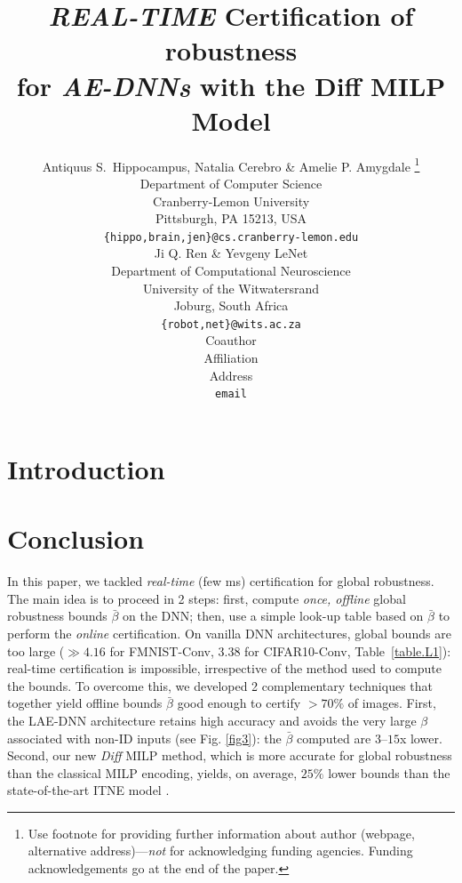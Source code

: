 \documentclass{article} %
\title{\emph{REAL-TIME} Certification of robustness 
\\ for \emph{AE-DNNs} with the Diff MILP Model}
\author{Antiquus S.~Hippocampus, Natalia Cerebro \& Amelie P. Amygdale \thanks{ Use footnote for providing further information
about author (webpage, alternative address)---\emph{not} for acknowledging
funding agencies.  Funding acknowledgements go at the end of the paper.} \\
Department of Computer Science\\
Cranberry-Lemon University\\
Pittsburgh, PA 15213, USA \\
\texttt{\{hippo,brain,jen\}@cs.cranberry-lemon.edu} \\
\And
Ji Q. Ren \& Yevgeny LeNet \\
Department of Computational Neuroscience \\
University of the Witwatersrand \\
Joburg, South Africa \\
\texttt{\{robot,net\}@wits.ac.za} \\
\AND
Coauthor \\
Affiliation \\
Address \\
\texttt{email}
}
\begin{document}
\maketitle

\begin{abstract}
	
	
	
\end{abstract}


\section{Introduction}
















\section{Conclusion}
In this paper, we tackled {\em real-time} (few ms) certification for global robustness. %
The main idea is to proceed in 2 steps: first, compute {\em once, offline} global robustness bounds $\bar{\beta}$ on the DNN; then,  use a simple look-up table based on $\bar{\beta}$ to perform the {\em online} certification. 
%
On vanilla DNN architectures, global bounds are too large ($\gg 4.16$ for FMNIST-Conv, $3.38$ for CIFAR10-Conv, Table~\ref{table.L1}): real-time certification is impossible, irrespective of the method used to compute the bounds. 
To overcome this, we developed 2 complementary techniques that together yield offline bounds $\bar{\beta}$ good enough to certify $>70\%$ of images. First, the LAE-DNN architecture retains high accuracy and avoids the very large $\beta$ associated with non-ID inputs (see Fig. \ref{fig3}):
the $\bar{\beta}$ computed are $3$--$15$x lower.
Second, our new {\em Diff} MILP method, which is more accurate for global robustness than the classical MILP encoding, yields, on average, $25\%$ lower bounds than the state-of-the-art ITNE model \citep{ITNE}.
\end{document}
